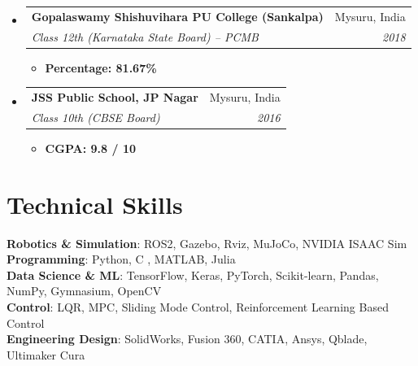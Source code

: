 \documentclass[a4paper,10pt]{article}
\makeatletter
\newcommand{\resumeSubheading}[4]{
	\vspace{4pt}\item
	\begin{tabular*}{0.99\textwidth}[t]{l@{\extracolsep{\fill}}r}
		\textbf{#1} & #2 \\
		\textit{\small#3} & \textit{\small #4} \\
	\end{tabular*}\vspace{3pt}
}
\makeatother
\begin{document}
\begin{itemize}[leftmargin=0.15in, label={}]
		\resumeSubheading
		{Gopalaswamy Shishuvihara PU College (Sankalpa)}{Mysuru, India}
		{Class 12th (Karnataka State Board) -- PCMB}{2018}
		\begin{itemize}
			\item \textbf{Percentage: 81.67\%}
		\end{itemize}
		
		\resumeSubheading
		{JSS Public School, JP Nagar}{Mysuru, India}
		{Class 10th (CBSE Board)}{2016}
		\begin{itemize}
			\item \textbf{CGPA: 9.8 / 10}
		\end{itemize}
	\end{itemize}
	
	\section{Technical Skills}
	\begin{itemize}[leftmargin=0.15in, label={}]
		\vspace{6pt}
		\small{\item{
				\textbf{Robotics \& Simulation}{: ROS2, Gazebo, Rviz, MuJoCo, NVIDIA ISAAC Sim} \\
				\textbf{Programming}{: Python, C	, MATLAB, Julia} \\
				\textbf{Data Science \& ML}{: TensorFlow, Keras, PyTorch, Scikit-learn, Pandas, NumPy, Gymnasium, OpenCV} \\
				\textbf{Control}{: LQR, MPC, Sliding Mode Control, Reinforcement Learning Based Control} \\
				\textbf{Engineering Design}{: SolidWorks, Fusion 360, CATIA, Ansys, Qblade, Ultimaker Cura}
		}}
	\end{itemize}
	
\end{document}
